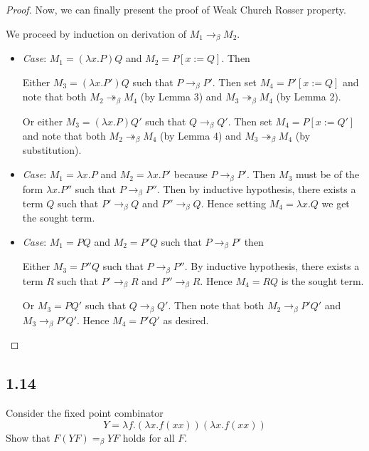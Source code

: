 \documentclass[12pt]{article}
\begin{document}
\begin{proof}
Now, we can finally present the proof of Weak Church Rosser property.

We proceed by induction on derivation of $M_1 \rightarrow_{\beta} M_2$.

\begin{itemize}
\item \textsl{Case}: $M_1 = (\lambda x. P) Q$ and $M_2 = P[x:=Q]$. Then 

Either $M_3 = (\lambda x. P') Q$ such that $P \rightarrow_\beta P'$. Then set $M_4 = P'[x:=Q]$ and note that both $M_2 \twoheadrightarrow_\beta M_4$ (by Lemma 3) and $M_3 \twoheadrightarrow_\beta M_4$ (by Lemma 2).

Or either $M_3 = (\lambda x. P) Q'$ such that $Q \rightarrow_\beta Q'$. Then set $M_4 = P[x:=Q']$ and note that both $M_2 \twoheadrightarrow_\beta M_4$ (by Lemma 4) and $M_3 \twoheadrightarrow_\beta M_4$ (by substitution).

\item \textsl{Case}: $M_1 = \lambda x. P$ and $M_2 = \lambda x. P'$ because $P \rightarrow_\beta P'$. Then $M_3$ must be of the form $\lambda x. P''$ such that $P \rightarrow_\beta P''$. Then by inductive hypothesis, there exists a term $Q$ such that $P' \rightarrow_\beta Q$ and $P'' \rightarrow_\beta Q$. Hence setting $M_4 = \lambda x. Q$ we get the sought term.

\item \textsl{Case}: $M_1 = P Q$ and $M_2 = P' Q$ such that $P \rightarrow_\beta P'$ then

Either $M_3 = P'' Q$ such that $P \rightarrow_\beta P''$. By inductive hypothesis, there exists a term $R$ such that $P' \rightarrow_\beta R$ and $P'' \rightarrow_\beta R$. Hence $M_4 = R Q$ is the sought term.

Or $M_3 = P Q'$ such that $Q \rightarrow_\beta Q'$. Then note that both $M_2 \rightarrow_\beta P' Q'$ and $M_3 \rightarrow_\beta P' Q'$. Hence $M_4 = P' Q'$ as desired.
\end{itemize}

\end{proof}

\subsection*{1.14}
Consider the fixed point combinator 
$$Y = \lambda f.(\lambda x.f (xx))(\lambda x.f (xx))$$
Show that $F(YF) =_\beta YF$ holds for all $F$. \\
\end{document}
